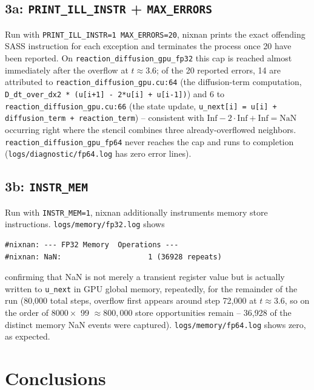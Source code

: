 \documentclass[11pt,a4paper]{article}
\begin{document}
\subsection{3a: \texttt{PRINT\_ILL\_INSTR} + \texttt{MAX\_ERRORS}}

Run with \texttt{PRINT\_ILL\_INSTR=1 MAX\_ERRORS=20}, nixnan prints the
exact offending SASS instruction for each exception and terminates the
process once 20 have been reported. On \texttt{reaction\_diffusion\_gpu\_fp32}
this cap is reached almost immediately after the overflow at $t\approx3.6$;
of the 20 reported errors, 14 are attributed to
\texttt{reaction\_diffusion\_gpu.cu:64} (the diffusion-term computation,
\texttt{D\_dt\_over\_dx2 * (u[i+1] - 2*u[i] + u[i-1])}) and 6 to
\texttt{reaction\_diffusion\_gpu.cu:66} (the state update,
\texttt{u\_next[i] = u[i] + diffusion\_term + reaction\_term}) --
consistent with $\text{Inf} - 2\cdot\text{Inf} + \text{Inf} = \text{NaN}$
occurring right where the stencil combines three already-overflowed
neighbors. \texttt{reaction\_diffusion\_gpu\_fp64} never reaches the cap
and runs to completion (\texttt{logs/diagnostic/fp64.log} has zero error
lines).

\subsection{3b: \texttt{INSTR\_MEM}}

Run with \texttt{INSTR\_MEM=1}, nixnan additionally instruments memory
store instructions. \texttt{logs/memory/fp32.log} shows

\begin{lstlisting}
#nixnan: --- FP32 Memory  Operations ---
#nixnan: NaN:                    1 (36928 repeats)
\end{lstlisting}

\noindent confirming that NaN is not merely a transient register value but
is actually written to \texttt{u\_next} in GPU global memory, repeatedly,
for the remainder of the run (80{,}000 total steps, overflow first appears
around step 72{,}000 at $t\approx3.6$, so on the order of $8000\times$
99 $\approx 800{,}000$ store opportunities remain -- 36{,}928 of the
distinct memory NaN events were captured). \texttt{logs/memory/fp64.log}
shows zero, as expected.

\section{Conclusions}
\end{document}
